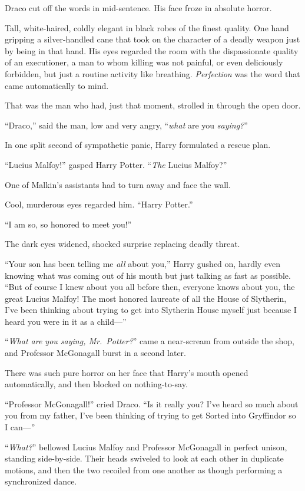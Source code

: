 Draco cut off the words in mid-sentence. His face froze in absolute horror.

Tall, white-haired, coldly elegant in black robes of the finest quality. One hand gripping a silver-handled cane that took on the character of a deadly weapon just by being in that hand. His eyes regarded the room with the dispassionate quality of an executioner, a man to whom killing was not painful, or even deliciously forbidden, but just a routine activity like breathing. \emph{Perfection} was the word that came automatically to mind.

That was the man who had, just that moment, strolled in through the open door.

“Draco,” said the man, low and very angry, “\emph{what} are you \emph{saying?}”

In one split second of sympathetic panic, Harry formulated a rescue plan.

“Lucius Malfoy!” gasped Harry Potter. “\emph{The} Lucius Malfoy?”

One of Malkin’s assistants had to turn away and face the wall.

Cool, murderous eyes regarded him. “Harry Potter.”

“I am so, so honored to meet you!”

The dark eyes widened, shocked surprise replacing deadly threat.

“Your son has been telling me \emph{all} about you,” Harry gushed on, hardly even knowing what was coming out of his mouth but just talking as fast as possible. “But of course I knew about you all before then, everyone knows about you, the great Lucius Malfoy! The most honored laureate of all the House of Slytherin, I’ve been thinking about trying to get into Slytherin House myself just because I heard you were in it as a child—”

“\emph{What are you saying, Mr.~Potter?}” came a near-scream from outside the shop, and Professor McGonagall burst in a second later.

There was such pure horror on her face that Harry’s mouth opened automatically, and then blocked on nothing-to-say.

“Professor McGonagall!” cried Draco. “Is it really you? I’ve heard so much about you from my father, I’ve been thinking of trying to get Sorted into Gryffindor so I can—”

“\emph{What?}” bellowed Lucius Malfoy and Professor McGonagall in perfect unison, standing side-by-side. Their heads swiveled to look at each other in duplicate motions, and then the two recoiled from one another as though performing a synchronized dance.

